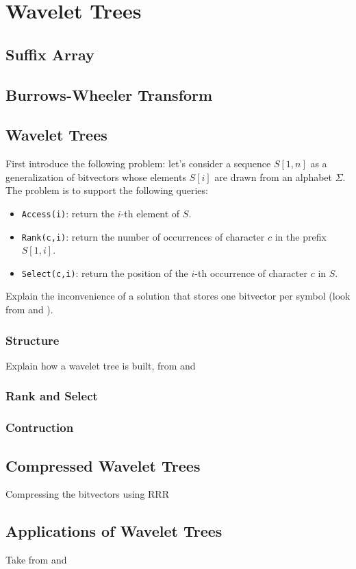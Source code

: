 
\chapter{Wavelet Trees} %

\label{ch:Chapter3} %

\section{Suffix Array}

\section{Burrows-Wheeler Transform}

\section{Wavelet Trees}
First introduce the following problem: let's consider a sequence $S[1,n]$ as a generalization of bitvectors whose elements $S[i]$ are drawn from an alphabet $\Sigma$. The problem is to support the following queries:

\begin{itemize}
    \item \texttt{Access(i)}: return the $i$-th element of $S$.
    \item \texttt{Rank(c,i)}: return the number of occurrences of character $c$ in the prefix $S[1,i]$.
    \item \texttt{Select(c,i)}: return the position of the $i$-th occurrence of character $c$ in $S$.
\end{itemize}

Explain the inconvenience of a solution that stores one bitvector per symbol (look from \cite{navarro2016compact} and \cite{ferragina2023pearls}).

\subsection{Structure}

Explain how a wavelet tree is built, from \cite{navarro2016compact} and \cite{GrossiWT2003}

\subsection{Rank and Select}

\subsection{Contruction}

\section{Compressed Wavelet Trees}
Compressing the bitvectors using RRR

\section{Applications of Wavelet Trees}
Take from \cite{WTForALL} and \cite{WTFromTheoryToPractice}
